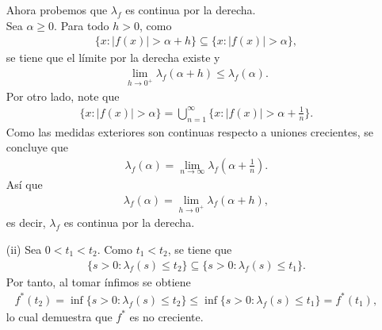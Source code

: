 \begin{homeworkProblem}
\begin{solution}
\begin{itemize}
        Ahora probemos que $\lambda_f$ es continua por la derecha.\\
        Sea $\alpha \geq 0$. Para todo $h > 0$, como
        \begin{align*}
          \{x : |f(x)| > \alpha + h\} \subseteq \{x : |f(x)| > \alpha\},
        \end{align*}
        se tiene que el límite por la derecha existe y
        \begin{align*}
          \lim_{h \to 0^+} \lambda_f(\alpha + h) \leq \lambda_f(\alpha).
        \end{align*}
        Por otro lado, note que
        \begin{align*}
          \{x : |f(x)| > \alpha\} = \bigcup_{n=1}^\infty \{x : |f(x)| > \alpha + \tfrac{1}{n}\}.
        \end{align*}
        Como las medidas exteriores son continuas respecto a uniones crecientes, se concluye que
        \begin{align*}
          \lambda_f(\alpha) = \lim_{n \to \infty} \lambda_f\left(\alpha + \tfrac{1}{n} \right).
        \end{align*}
        Así que
        \begin{align*}
          \lambda_f(\alpha) = \lim_{h \to 0^+} \lambda_f(\alpha + h),
        \end{align*}
        es decir, $\lambda_f$ es continua por la derecha.
      \item[(ii)] Sea $0 < t_1 < t_2$. Como $t_1 < t_2$, se tiene que
        \begin{align*}
          \{ s > 0 : \lambda_f(s) \leq t_2 \} \subseteq \{ s > 0 : \lambda_f(s) \leq t_1 \}.
        \end{align*}
        Por tanto, al tomar ínfimos se obtiene
        \begin{align*}
          f^*(t_2) = \inf\{ s > 0 : \lambda_f(s) \leq t_2 \} \leq \inf\{ s > 0 : \lambda_f(s) \leq t_1 \} = f^*(t_1),
        \end{align*}
        lo cual demuestra que $f^*$ es no creciente.
      

\end{itemize}
\end{solution}
\end{homeworkProblem}
